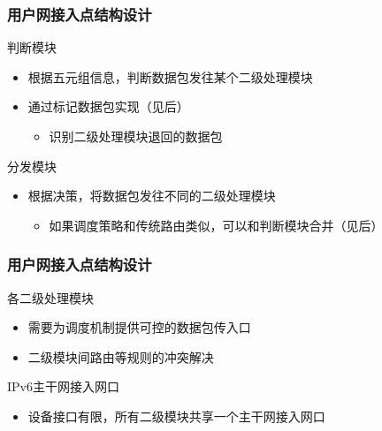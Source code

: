 \documentclass{beamer}
\begin{document}
\begin{frame}
  \frametitle{用户网接入点结构设计}
  \begin{block}{判断模块}
    \begin{itemize}
    \item 根据五元组信息，判断数据包发往某个二级处理模块
    \item 通过标记数据包实现（见后）
      \begin{itemize}
      \item 识别二级处理模块退回的数据包
      \end{itemize}
    \end{itemize}
  \end{block}

  \begin{block}{分发模块}
    \begin{itemize}
    \item 根据决策，将数据包发往不同的二级处理模块
      \begin{itemize}
      \item 如果调度策略和传统路由类似，可以和判断模块合并（见后） 
      \end{itemize}
    \end{itemize}
  \end{block}
\end{frame}

\begin{frame}
  \frametitle{用户网接入点结构设计}
  \begin{block}{各二级处理模块}
    \begin{itemize}
    \item 需要为调度机制提供可控的数据包传入口
    \item 二级模块间路由等规则的冲突解决
    \end{itemize}
  \end{block}

  \begin{block}{IPv6主干网接入网口}
    \begin{itemize}
    \item 设备接口有限，所有二级模块共享一个主干网接入网口
    \end{itemize}
  \end{block}
\end{frame}
\end{document}
